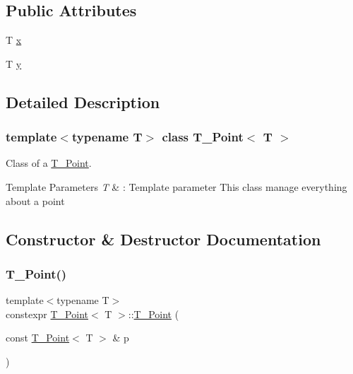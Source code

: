\subsection*{Public Attributes}
\begin{DoxyCompactItemize}
\item 
T \hyperlink{classT__Point_a45cc1c670a8d9bc786a38428cdce4bd2}{x}
\item 
T \hyperlink{classT__Point_a28da35a974844bdb3509a90345d3c1f9}{y}
\end{DoxyCompactItemize}


\subsection{Detailed Description}
\subsubsection*{template$<$typename T$>$\newline
class T\+\_\+\+Point$<$ T $>$}

Class of a \hyperlink{classT__Point}{T\+\_\+\+Point}. 


\begin{DoxyTemplParams}{Template Parameters}
{\em T} & \+: Template parameter This class manage everything about a point \\
\hline
\end{DoxyTemplParams}


\subsection{Constructor \& Destructor Documentation}
\mbox{\label{classT__Point_af313da04154273b9a75d66e9950359ea}} 
\subsubsection{\texorpdfstring{T\+\_\+\+Point()}{T\_Point()}\hspace{0.1cm}{\footnotesize\ttfamily [1/4]}}
{\footnotesize\ttfamily template$<$typename T$>$ \\
constexpr \hyperlink{classT__Point}{T\+\_\+\+Point}$<$ T $>$\+::\hyperlink{classT__Point}{T\+\_\+\+Point} (\begin{DoxyParamCaption}\item[{const \hyperlink{classT__Point}{T\+\_\+\+Point}$<$ T $>$ \&}]{p }\end{DoxyParamCaption})\hspace{0.3cm}{\ttfamily [default]}}

